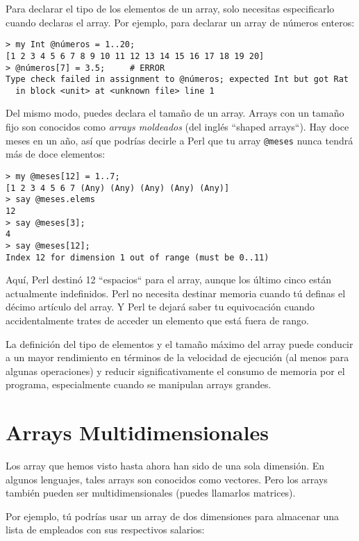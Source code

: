 Para declarar el tipo de los elementos de un array, solo
necesitas especificarlo cuando declaras el array. Por ejemplo,
para declarar un array de números enteros:

\begin{verbatim}
> my Int @números = 1..20;
[1 2 3 4 5 6 7 8 9 10 11 12 13 14 15 16 17 18 19 20]
> @números[7] = 3.5;     # ERROR
Type check failed in assignment to @números; expected Int but got Rat
  in block <unit> at <unknown file> line 1
\end{verbatim}
%

Del mismo modo, puedes declara el tamaño de un array. Arrays 
con un tamaño fijo son conocidos como \emph{arrays moldeados} 
(del inglés ``shaped arrays``). Hay doce meses en un año, así que 
podrías decirle a Perl que tu array \verb|@meses| nunca tendrá 
más de doce elementos:
\begin{verbatim}
> my @meses[12] = 1..7;
[1 2 3 4 5 6 7 (Any) (Any) (Any) (Any) (Any)]
> say @meses.elems
12
> say @meses[3];
4
> say @meses[12];
Index 12 for dimension 1 out of range (must be 0..11)
\end{verbatim}
%

Aquí, Perl destinó 12 ``espacios`` para el array, aunque los
último cinco están actualmente indefinidos. Perl no necesita
destinar memoria cuando tú definas el décimo artículo del array.
Y Perl te dejará saber tu equivocación cuando accidentalmente 
trates de acceder un elemento que está fuera de rango.

La definición del tipo de elementos y el tamaño máximo del array
puede conducir a un mayor rendimiento en términos de la
velocidad de ejecución (al menos para algunas operaciones) y 
reducir significativamente el consumo de memoria por el 
programa, especialmente cuando se manipulan arrays grandes.

\section{Arrays Multidimensionales}
\label{multidimensional_array}

Los array que hemos visto hasta ahora han sido 
de una sola dimensión. En algunos lenguajes, tales arrays
son conocidos como vectores. Pero los arrays también 
pueden ser multidimensionales (puedes llamarlos matrices).

Por ejemplo, tú podrías usar un array de dos dimensiones 
para almacenar una lista de empleados con sus respectivos
salarios:


